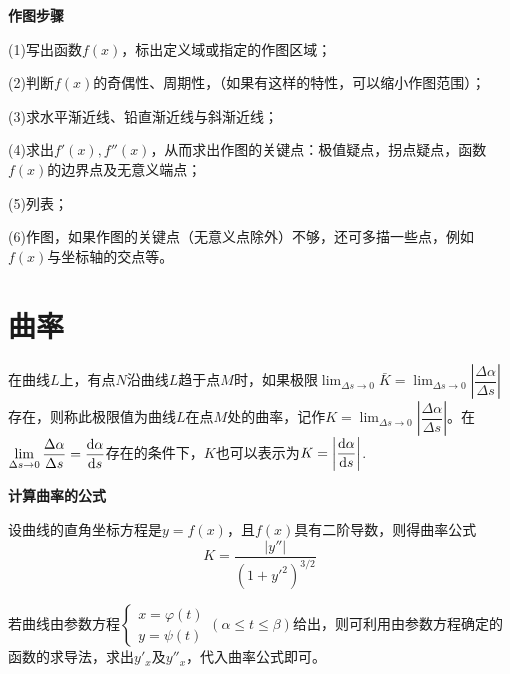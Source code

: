 \textbf{作图步骤}

(1)写出函数$f(x)$，标出定义域或指定的作图区域；

(2)判断$f(x)$的奇偶性、周期性，（如果有这样的特性，可以缩小作图范围）；

(3)求水平渐近线、铅直渐近线与斜渐近线；

(4)求出$f'(x),f''(x)$，从而求出作图的关键点：极值疑点，拐点疑点，函数$f(x)$的边界点及无意义端点；

(5)列表；

(6)作图，如果作图的关键点（无意义点除外）不够，还可多描一些点，例如$f(x)$与坐标轴的交点等。

\section{曲率}
\begin{definition}[曲率的定义] \label{def:curvature}
    在曲线$L$上，有点$N$沿曲线$L$趋于点$M$时，如果极限$\displaystyle\lim_{\Delta s\rightarrow0}\bar{K}=\lim_{\Delta s\rightarrow0}\left|\dfrac{\Delta\alpha}{\Delta s}\right|$存在，则称此极限值为曲线$L$在点$M$处的曲率，记作$\displaystyle K=\lim_{\Delta s\rightarrow0}\left|\dfrac{\Delta \alpha}{\Delta s}\right|$。在$\displaystyle\lim_{\Delta s\rightarrow 0}\dfrac{\Delta \alpha}{\Delta s} = \dfrac{\mathrm{d} \alpha}{\mathrm{d} s}$存在的条件下，$K$也可以表示为$K=\left|\dfrac{\mathrm{d} \alpha}{\mathrm{d} s}\right|$.
\end{definition}

\textbf{计算曲率的公式}

设曲线的直角坐标方程是$y=f(x)$，且$f(x)$具有二阶导数，则得曲率公式
\begin{equation}
    K=\dfrac{\left|y''\right|}{(1+y'^2)^{3/2}}
    \nonumber
\end{equation}

若曲线由参数方程$\displaystyle \left\{\begin{array}{l} x=\varphi(t) \\ y=\psi(t) \end{array}\right.$$(\alpha\leq t \leq\beta)$给出，则可利用由参数方程确定的函数的求导法，求出$y'_x$及$y''_x$，代入曲率公式即可。